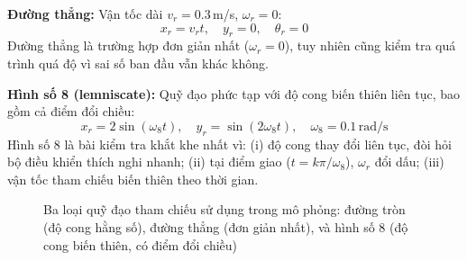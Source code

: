 \documentclass[12pt,a4paper]{article}
\begin{document}
\textbf{Đường thẳng:} Vận tốc dài $v_r = 0.3$\,m/s, $\omega_r = 0$:
\begin{equation}\label{eq:ref_line}
    x_r = v_r t, \quad y_r = 0, \quad \theta_r = 0
\end{equation}
Đường thẳng là trường hợp đơn giản nhất ($\omega_r = 0$), tuy nhiên cũng kiểm tra quá trình quá độ vì sai số ban đầu vẫn khác không.

\textbf{Hình số 8 (lemniscate):} Quỹ đạo phức tạp với độ cong biến thiên liên tục, bao gồm cả điểm đổi chiều:
\begin{equation}\label{eq:ref_fig8}
    x_r = 2\sin(\omega_8 t), \quad y_r = \sin(2\omega_8 t), \quad \omega_8 = 0.1\,\text{rad/s}
\end{equation}
Hình số 8 là bài kiểm tra khắt khe nhất vì: (i) độ cong thay đổi liên tục, đòi hỏi bộ điều khiển thích nghi nhanh; (ii) tại điểm giao ($t = k\pi/\omega_8$), $\omega_r$ đổi dấu; (iii) vận tốc tham chiếu biến thiên theo thời gian.

\begin{figure}[H]
\centering
{}
\caption{Ba loại quỹ đạo tham chiếu sử dụng trong mô phỏng: đường tròn (độ cong hằng số), đường thẳng (đơn giản nhất), và hình số 8 (độ cong biến thiên, có điểm đổi chiều)}
\label{fig:ref_trajectories}
\end{figure}
\end{document}

